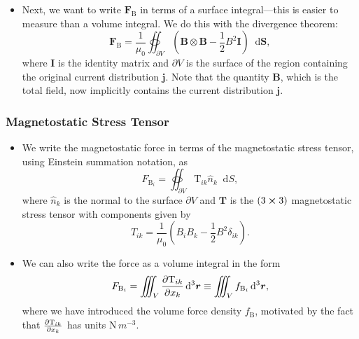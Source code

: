 \documentclass[11pt, a4paper]{article}
\newcommand{\diff}{\mathop{}\!\mathrm{d}} %
\newcommand{\dr}{\diff^{3} \r}  %
\renewcommand{\vec}[1]{\bm{#1}} %
\newcommand{\mat}[1]{\mathbf{#1}} %
\renewcommand{\r}{\vec{r}}
\newcommand{\B}{\vec{B}} %
\newcommand{\TT}{\mathrm{T}}  %
\newcommand{\mm}{\mu_{0}}  %
\renewcommand{\j}{\vec{j}}  %
\begin{document}
\begin{itemize}
	\item Next, we want to write $ \vec{F}_{\text{B}} $ in terms of a surface integral---this is easier to measure than a volume integral. We do this with the divergence theorem:
	\begin{equation*}
		\vec{F}_{\text{B}} = \frac{1}{\mm}\oiint_{\partial V}\left(\B \otimes \B - \frac{1}{2}B^{2}\mat{I}\right)\diff \vec{S},
	\end{equation*}
	where $ \mat{I} $ is the identity matrix and $ \partial V $ is the surface of the region containing the original current distribution $ \j $. Note that the quantity $ \B $, which is the total field, now implicitly contains the current distribution $ \j $.
\end{itemize}


\subsubsection{Magnetostatic Stress Tensor}
\begin{itemize}
	\item We write the magnetostatic force in terms of the magnetostatic stress tensor, using Einstein summation notation, as
	\begin{equation*}
		F_{\text{B}_{i}} = \oiint_{\partial V} \TT_{ik} \hat{n}_{k}\diff S,
	\end{equation*}
	where $ \hat{n}_{k} $ is the normal to the surface $ \partial V $ and $ \mat{T} $ is the $ (3 \cross 3) $ magnetostatic stress tensor with components given by
	\begin{equation*}
		T_{ik} = \frac{1}{\mm}\left(B_{i}B_{k} - \frac{1}{2}B^{2}\delta_{ik}\right).
	\end{equation*}
	
	\item We can also write the force as a volume integral in the form
	\begin{equation*}
		F_{\text{B}_{i}} = \iiint_{V}\pdv{\TT_{ik}}{x_{k}}\dr \equiv \iiint_{V}f_{\text{B}_{i}} \dr,
	\end{equation*} 
	where we have introduced the volume force density $ f_{\text{B}} $, motivated by the fact that $ \pdv{\TT_{ik}}{x_{k}} $ has units $ \si{\newton \, m^{-3}} $.
	
\end{itemize}
\end{document}
